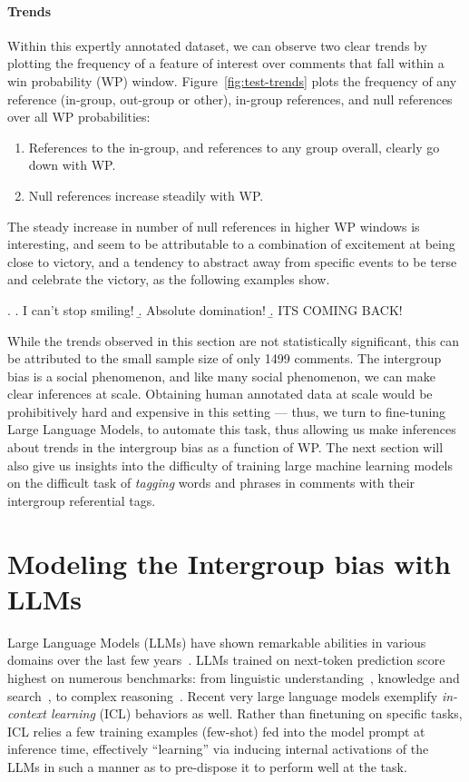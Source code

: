 \paragraph{Trends} Within this expertly annotated dataset, we can observe two clear trends by plotting the frequency of a feature of interest over comments that fall within a win probability (WP) window. Figure~\ref{fig:test-trends} plots the frequency of any reference (in-group, out-group or other), in-group references, and null references over all WP probabilities:

\begin{enumerate}
    \item References to the in-group, and references to any group overall, clearly go down with WP.
    \item Null references increase steadily with WP.
\end{enumerate}

The steady increase in number of null references in higher WP windows is interesting, and seem to be attributable to a combination of excitement at being close to victory, and a tendency to abstract away from specific events to be terse and celebrate the victory, as the following examples show.

\ex. \a. I can't stop smiling!
     \b. Absolute domination!
     \b. ITS COMING BACK!

While the trends observed in this section are not statistically significant, this can be attributed to the small sample size of only 1499 comments. The intergroup bias is a social phenomenon, and like many social phenomenon, we can make clear inferences at scale. Obtaining human annotated data at scale would be prohibitively hard and expensive in this setting --- thus, we turn to fine-tuning Large Language Models, to automate this task, thus allowing us make inferences about trends in the intergroup bias as a function of WP. The next section will also give us insights into the difficulty of training large machine learning models on the difficult task of \emph{tagging} words and phrases in comments with their intergroup referential tags.

\section{Modeling the Intergroup bias with LLMs}
\label{sec:football-models}

Large Language Models (LLMs) have shown remarkable abilities in various domains over the last few years~\citep{Brown2020LanguageMA}. LLMs trained on next-token prediction score highest on numerous benchmarks: from linguistic understanding~\citep{srivastava2023beyond}, knowledge and search~\citep{geminiteam2023gemini}, to complex reasoning~\citep{NEURIPS2022_9d560961}. Recent very large language models exemplify \emph{in-context learning} (ICL) behaviors as well. Rather than finetuning on specific tasks, ICL relies a few training examples (few-shot) fed into the model prompt at inference time, effectively ``learning'' via inducing internal activations of the LLMs in such a manner as to pre-dispose it to perform well at the task.

